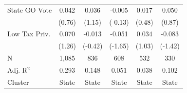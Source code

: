 \begin{tabular*}{\textwidth}{@{\extracolsep{\fill}}lccccc}
   State GO Vote        & 0.042          & 0.036          & -0.005        & 0.017         & 0.050\\   
                        & (0.76)        & (1.15)        & (-0.13)      & (0.48)       & (0.87)\\   
   Low Tax Priv.        & 0.070          & -0.013         & -0.051        & 0.034         & -0.083\\   
                        & (1.26)        & (-0.42)       & (-1.65)      & (1.03)       & (-1.42)\\   
   \hline
   N         & 1,085          & 836            & 608           & 532           & 330\\  
   Adj. R$^2$       & 0.293          & 0.148          & 0.051         & 0.038         & 0.102\\  
   Cluster              & State & State & State & State & State\\  
   \bottomrule
\end{tabular*}
\par\endgroup
